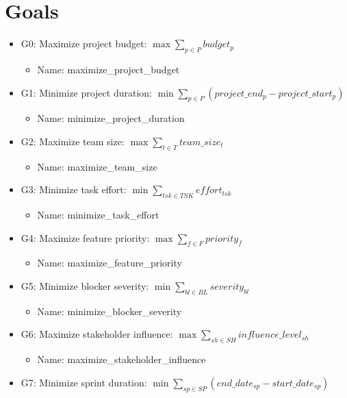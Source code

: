 \documentclass{article}
\begin{document}
\section{Goals}
\begin{itemize}
    \item G0: Maximize project budget: $\max \sum_{p \in P} budget_p$
        \begin{itemize}
            \item Name: maximize\_project\_budget
        \end{itemize}
    \item G1: Minimize project duration: $\min \sum_{p \in P} (project\_end_p - project\_start_p)$
        \begin{itemize}
            \item Name: minimize\_project\_duration
        \end{itemize}
    \item G2: Maximize team size: $\max \sum_{t \in T} team\_size_t$
        \begin{itemize}
            \item Name: maximize\_team\_size
        \end{itemize}
    \item G3: Minimize task effort: $\min \sum_{tsk \in TSK} effort_{tsk}$
        \begin{itemize}
            \item Name: minimize\_task\_effort
        \end{itemize}
    \item G4: Maximize feature priority: $\max \sum_{f \in F} priority_f$
        \begin{itemize}
            \item Name: maximize\_feature\_priority
        \end{itemize}
    \item G5: Minimize blocker severity: $\min \sum_{bl \in BL} severity_{bl}$
        \begin{itemize}
            \item Name: minimize\_blocker\_severity
        \end{itemize}
    \item G6: Maximize stakeholder influence: $\max \sum_{sh \in SH} influence\_level_{sh}$
        \begin{itemize}
            \item Name: maximize\_stakeholder\_influence
        \end{itemize}
    \item G7: Minimize sprint duration: $\min \sum_{sp \in SP} (end\_date_{sp} - start\_date_{sp})$

\end{itemize}
\end{document}
